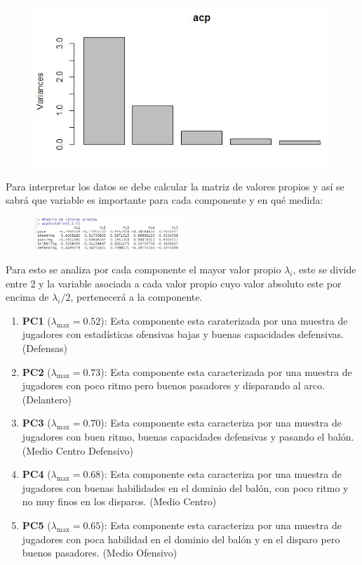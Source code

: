 \documentclass[a4paper,10pt,twocolumn]{article}
\begin{document}
\newpage

\begin{figure}[h]
	\includegraphics[scale=0.55]{./imgs/acp_plot.jpg}
\end{figure}

Para interpretar los datos se debe calcular la matriz de valores propios y así se sabrá que variable es importante para cada componente y en qué medida:

\begin{figure}[h]
	\includegraphics[width=0.5\textwidth]{./imgs/acp_vp.jpg}
\end{figure}


Para esto se analiza por cada componente el mayor valor propio $\lambda_i$, este se divide entre 2 y la variable asociada a cada valor propio cuyo valor absoluto este por encima de $\lambda_i / 2$, pertenecerá a la componente.

\begin{enumerate}
	\item[] \textbf{PC1} ($\lambda_{\max} = 0.52$): Esta componente esta caraterizada por una muestra de jugadores con estadísticas ofensivas bajas y buenas capacidades defensivas. (Defensas)
	
	\item[] \textbf{PC2} ($\lambda_{\max} = 0.73$): Esta componente esta caracterizada por una muestra de jugadores con poco ritmo pero buenos pasadores y disparando al arco. (Delantero)
	
	\item[] \textbf{PC3} ($\lambda_{\max} = 0.70$): Esta componente esta caracteriza por una muestra de	jugadores con buen ritmo, buenas capacidades defensivas y pasando el balón. (Medio Centro Defensivo) 
	
	\item[] \textbf{PC4} ($\lambda_{\max} = 0.68$): Esta componente esta caracteriza por una muestra de	jugadores con buenas habilidades en el dominio del balón, con poco ritmo y no muy finos en los disparos. (Medio Centro)
	
	\item[] \textbf{PC5} ($\lambda_{\max} = 0.65$): Esta componente esta caracteriza por una muestra de	jugadores con poca habilidad en el dominio del balón y en el disparo pero buenos pasadores. (Medio Ofensivo) 
	
\end{enumerate} 
\end{document}
